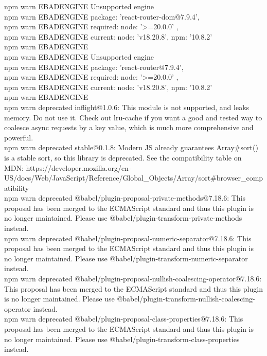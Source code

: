 \documentclass[12pt, a4paper]{article}
\begin{document}
\begin{monoblock}
            npm warn EBADENGINE Unsupported engine { \\
            npm warn EBADENGINE   package: 'react-router-dom@7.9.4', \\
            npm warn EBADENGINE   required: { node: '>=20.0.0' }, \\
            npm warn EBADENGINE   current: { node: 'v18.20.8', npm: '10.8.2' } \\
            npm warn EBADENGINE } \\
            npm warn EBADENGINE Unsupported engine { \\
            npm warn EBADENGINE   package: 'react-router@7.9.4', \\
            npm warn EBADENGINE   required: { node: '>=20.0.0' }, \\
            npm warn EBADENGINE   current: { node: 'v18.20.8', npm: '10.8.2' } \\
            npm warn EBADENGINE } \\
            npm warn deprecated inflight@1.0.6: This module is not supported, and leaks memory. Do not use it. Check out lru-cache if you want a good and tested way to coalesce async requests by a key value, which is much more comprehensive and powerful. \\
            npm warn deprecated stable@0.1.8: Modern JS already guarantees Array\#sort() is a stable sort, so this library is deprecated. See the compatibility table on MDN: https://developer.mozilla.org/en-US/docs/Web/JavaScript/Reference/Global\_Objects/Array/sort\#browser\_compatibility \\
            npm warn deprecated @babel/plugin-proposal-private-methods@7.18.6: This proposal has been merged to the ECMAScript standard and thus this plugin is no longer maintained. Please use @babel/plugin-transform-private-methods instead. \\
            npm warn deprecated @babel/plugin-proposal-numeric-separator@7.18.6: This proposal has been merged to the ECMAScript standard and thus this plugin is no longer maintained. Please use @babel/plugin-transform-numeric-separator instead. \\
            npm warn deprecated @babel/plugin-proposal-nullish-coalescing-operator@7.18.6: This proposal has been merged to the ECMAScript standard and thus this plugin is no longer maintained. Please use @babel/plugin-transform-nullish-coalescing-operator instead. \\
            npm warn deprecated @babel/plugin-proposal-class-properties@7.18.6: This proposal has been merged to the ECMAScript standard and thus this plugin is no longer maintained. Please use @babel/plugin-transform-class-properties instead. \\

\end{monoblock}
\end{document}
